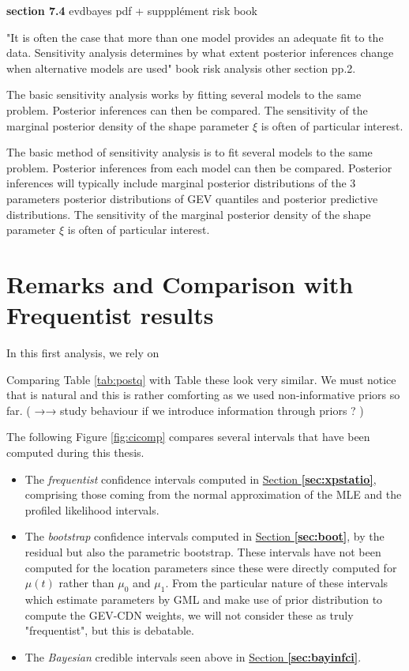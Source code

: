 \textbf{section 7.4} evdbayes pdf + suppplément risk book 

"It is often the case that more than one model provides an adequate fit to the data. Sensitivity analysis determines by what extent posterior inferences change when alternative
models are used"   book risk analysis other section pp.2.



The basic sensitivity analysis works by fitting several models to
the same problem. Posterior inferences can then be compared.
The sensitivity of the
marginal posterior density of the shape parameter $\xi$ is often of particular interest.


The basic method of sensitivity analysis is to fit several models to the same problem.
 Posterior inferences from each model can then be compared. Posterior inferences
will typically include marginal posterior distributions of the 3 parameters posterior distributions of GEV quantiles and posterior predictive distributions.
The sensitivity of the marginal posterior density of the shape parameter $\xi$ is often of particular interest.



\section{Remarks and Comparison with Frequentist results}

In this first analysis, we rely on 



Comparing Table \ref{tab:postq} with Table 
 these look very similar. We must notice that is natural and this is rather comforting as we used non-informative priors so far. ( →→ study behaviour if we introduce information through priors ? )

The following Figure \ref{fig:cicomp} compares several intervals that have been computed during this thesis. 

\begin{itemize}
	\item The \emph{frequentist} confidence intervals computed in
	\hyperref[sec:xpstatio]{Section \textbf{\ref{sec:xpstatio}}}, comprising those coming from the normal approximation of the MLE and the profiled likelihood intervals.
	\item The \emph{bootstrap} confidence intervals computed in  \hyperref[sec:boot]{Section \textbf{\ref{sec:boot}}}, by the residual but also the parametric bootstrap. These intervals have not been computed for the location parameters since these were directly computed for $\mu(t)$ rather than $\mu_0$ and $\mu_1$. From the particular nature of these intervals which estimate parameters by GML and make use of prior distribution to compute the GEV-CDN weights, we will not consider these as truly "frequentist", but this is debatable.
	\item The \emph{Bayesian} credible intervals seen  above in \hyperref[sec:bayinfci]{Section \textbf{\ref{sec:bayinfci}}}.
\end{itemize}

